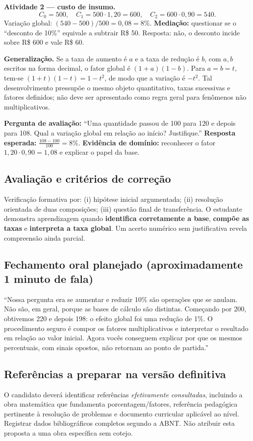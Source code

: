\documentclass[11pt,a4paper]{article}
\begin{document}
\textbf{Atividade 2 --- custo de insumo.}
\[
C_0=500,\quad C_1=500\cdot1{,}20=600,\quad
C_2=600\cdot0{,}90=540.
\]
Variação global: $(540-500)/500=0{,}08=\boxed{8\%}$. \textbf{Mediação:} questionar se o ``desconto de 10\%'' equivale a subtrair R\$ 50. Resposta: não, o desconto incide sobre R\$ 600 e vale R\$ 60.

\textbf{Generalização.} Se a taxa de aumento é $a$ e a taxa de redução é $b$, com $a,b$ escritos na forma decimal, o fator global é $(1+a)(1-b)$. Para $a=b=t$, tem-se $(1+t)(1-t)=1-t^2$, de modo que a variação é $-t^2$. Tal desenvolvimento pressupõe o mesmo objeto quantitativo, taxas sucessivas e fatores definidos; não deve ser apresentado como regra geral para fenômenos não multiplicativos.

\textbf{Pergunta de avaliação:} ``Uma quantidade passou de 100 para 120 e depois para 108. Qual a variação global em relação ao início? Justifique.'' \textbf{Resposta esperada:} $\frac{108-100}{100}=8\%$. \textbf{Evidência de domínio:} reconhecer o fator $1{,}20\cdot0{,}90=1{,}08$ e explicar o papel da base.

\subsection*{Avaliação e critérios de correção}
Verificação formativa por: (i) hipótese inicial argumentada; (ii) resolução orientada de duas composições; (iii) questão final de transferência. O estudante demonstra aprendizagem quando \textbf{identifica corretamente a base}, \textbf{compõe as taxas} e \textbf{interpreta a taxa global}. Um acerto numérico sem justificativa revela compreensão ainda parcial.

\subsection*{Fechamento oral planejado (aproximadamente 1 minuto de fala)}
``Nossa pergunta era se aumentar e reduzir 10\% são operações que se anulam. Não são, em geral, porque as bases de cálculo são distintas. Começando por 200, obtivemos 220 e depois 198: o efeito global foi uma redução de 1\%. O procedimento seguro é compor os fatores multiplicativos e interpretar o resultado em relação ao valor inicial. Agora vocês conseguem explicar por que os mesmos percentuais, com sinais opostos, não retornam ao ponto de partida.''

\subsection*{Referências a preparar na versão definitiva}
O candidato deverá identificar referências \textit{efetivamente consultadas}, incluindo a obra matemática que fundamenta porcentagem/fatores, referência pedagógica pertinente à resolução de problemas e documento curricular aplicável ao nível. Registrar dados bibliográficos completos segundo a ABNT. Não atribuir esta proposta a uma obra específica sem cotejo.
\end{document}
